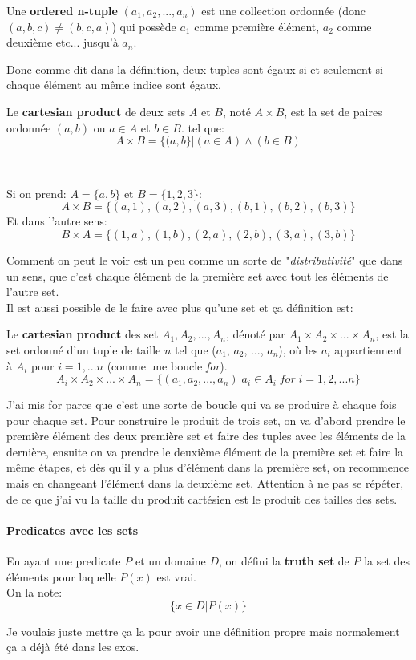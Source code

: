 \begin{definition}[Tuples]
    Une \textbf{ordered n-tuple} $(a_1, a_2, ..., a_n)$ est une collection ordonnée (donc $(a, b, c) \neq (b, c, a)$) qui possède $a_1$ comme première élément, $a_2$ comme deuxième etc... jusqu'à $a_n$.
\end{definition}
Donc comme dit dans la définition, deux tuples sont égaux si et seulement si chaque élément au même indice sont égaux.
\\
\begin{definition}
    Le \textbf{cartesian product} de deux sets $A$ et $B$, noté $A \times B$, est la set de paires ordonnée $(a, b)$ ou $a \in A$ et $b \in B$. tel que:
\[ A \times B =\{(a, b\}|(a \in A )\wedge (b \in B)\]
\end{definition}
\\
\begin{exemple}
    Si on prend: $A =\{a, b\}$ et $B = \{1, 2, 3\}$:
\[ A \times B =\{(a, 1), (a, 2), (a, 3), (b, 1), (b, 2), (b, 3)\}\] Et dans l'autre sens:
\[ B \times A =\{(1, a), (1, b), (2, a), (2, b), (3, a), (3, b)\}\]
\end{exemple}
Comment on peut le voir est un peu comme un sorte de "\textit{distributivité}" que dans un sens, que c'est chaque élément de la première set avec tout les éléments de l'autre set.
\\
Il est aussi possible de le faire avec plus qu'une set et ça définition est:
\begin{definition}
    Le \textbf{cartesian product} des set $A_1, A_2, ..., A_n$, dénoté par $A_1 \times A_2 \times ... \times A_n$, est la set ordonné d'un tuple de taille $n$ tel que ($a_1$, $a_2$, ..., $a_n$), où les $a_i$ appartiennent à $A_i$ pour $i = 1, ... n$ (comme une boucle \textit{for}).
    \[ A_i \times A_2 \times ... \times A_n  = \{(a_1, a_2, ..., a_n)|a_i \in A_i \; for \; i = 1, 2, ... n\}\]
\end{definition}
J'ai mis for parce que c'est une sorte de boucle qui va se produire à chaque fois pour chaque set. Pour construire le produit de trois set, on va d'abord prendre le première élément des deux première set et faire des tuples avec les éléments de la dernière, ensuite on va prendre le deuxième élément de la première set et faire la même étapes, et dès qu'il y a plus d'élément dans la première set, on recommence mais en changeant l'élément dans la deuxième set. Attention à ne pas se répéter, de ce que j'ai vu la taille du produit cartésien est le produit des tailles des sets.
\paragraph{Predicates avec les sets}
\begin{definition}
    En ayant une predicate $P$ et un domaine $D$, on défini la \textbf{truth set} de $P$ la set des éléments pour laquelle $P(x)$ est vrai.
    \\
    On la note:
    \[\{x \in D| P(x)\}\]
\end{definition}
Je voulais juste mettre ça la pour avoir une définition propre mais normalement ça a déjà été dans les exos.
\\
